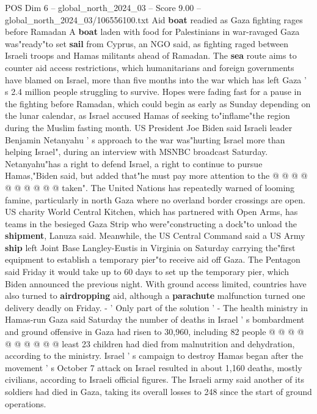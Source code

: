 \begin{textsample}{POS Dim 6 – global\_north\_2024\_03 – Score 9.00 – global\_north\_2024\_03/106556100.txt}  \label{ex:f6_pos_060}
Aid \textbf{boat} readied as Gaza fighting rages before Ramadan A \textbf{boat} laden with food for Palestinians in war-ravaged Gaza was"ready"to set \textbf{sail} from Cyprus, an NGO said, as fighting raged between Israeli troops and Hamas militants ahead of Ramadan.
The \textbf{sea} route aims to counter aid access restrictions, which humanitarians and foreign governments have blamed on Israel, more than five months into the war which has left Gaza ' s 2.4 million people struggling to survive.
Hopes were fading fast for a pause in the fighting before Ramadan, which could begin as early as Sunday depending on the lunar calendar, as Israel accused Hamas of seeking to"inflame"the region during the Muslim fasting month.
US President Joe Biden said Israeli leader Benjamin Netanyahu ' s approach to the war was"hurting Israel more than helping Israel", during an interview with MSNBC broadcast Saturday.
Netanyahu"has a right to defend Israel, a right to continue to pursue Hamas,"Biden said, but added that"he must pay more attention to the @ @ @ @ @ @ @ @ @ @ taken".
The United Nations has repeatedly warned of looming famine, particularly in north Gaza where no overland border crossings are open.
US charity World Central Kitchen, which has partnered with Open Arms, has teams in the besieged Gaza Strip who were"constructing a dock"to unload the \textbf{shipment}, Lanuza said.
Meanwhile, the US Central Command said a US Army \textbf{ship} left Joint Base Langley-Eustis in Virginia on Saturday carrying the"first equipment to establish a temporary pier"to receive aid off Gaza.
The Pentagon said Friday it would take up to 60 days to set up the temporary pier, which Biden announced the previous night.
With ground access limited, countries have also turned to \textbf{airdropping} aid, although a \textbf{parachute} malfunction turned one delivery deadly on Friday. - ' Only part of the solution ' - The health ministry in Hamas-run Gaza said Saturday the number of deaths in Israel ' s bombardment and ground offensive in Gaza had risen to 30,960, including 82 people @ @ @ @ @ @ @ @ @ @ least 23 children had died from malnutrition and dehydration, according to the ministry.
Israel ' s campaign to destroy Hamas began after the movement ' s October 7 attack on Israel resulted in about 1,160 deaths, mostly civilians, according to Israeli official figures.
The Israeli army said another of its soldiers had died in Gaza, taking its overall losses to 248 since the start of ground operations.

\end{textsample}
